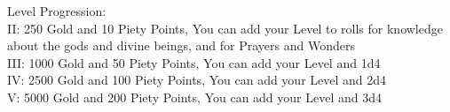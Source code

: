 Level Progression:\\
II: 250 Gold and 10 Piety Points, You can add your Level to rolls for knowledge about the gods and divine beings, and for Prayers and Wonders\\
III: 1000 Gold and 50 Piety Points, You can add your Level and 1d4\\
IV: 2500 Gold and 100 Piety Points, You can add your Level and 2d4\\
V: 5000 Gold and 200 Piety Points, You can add your Level and 3d4\\